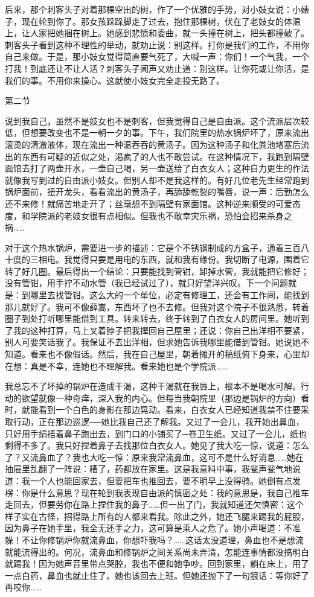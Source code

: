 后来，那个刺客头子对着那棵空出的树，作了一个优雅的手势，对小妓女说：小婊子，现在轮到你了。那女孩跺跺脚走了过去，抱住那棵树，伏在了老妓女的体温上，让人家把她捆在树上。她感到悲愤和委曲，就一头撞在树上，把头都撞破了。刺客头子看到这种不理性的举动，就劝止说：别这样。打你是我们的工作，不用你自己来做。于是，那小妓女觉得简直要气死了，大喊一声：你们！一个气我，一个打我！到底还让不让人活？刺客头子闻声又劝止道：别这样。让你死或让你活，是我们的事。不用你来操心。这就使小妓女完全走投无路了。 

第二节 

说到我自己，虽然不是妓女也不是刺客，但我觉得自己是自由派。这个流派层次较低，但想要改变也不是一朝一夕的事。下午，我们院里的热水锅炉坏了，原来流出滚烫的清澈液体，现在流出一种温吞吞的黄汤子。因为这种汤子和化粪池堵塞后流出的东西有可疑的近似之处，渴疯了的人也不敢尝试。在这种情况下，我跑到隔壁面馆去打了两壶开水，一壶自己喝，另一壶送给了白衣女人；这种自力更生的作法就像我写到过的自由派小妓女。但别人却不是我这样的。有好几位老先生经常跑到锅炉面前，扭开龙头，看看流出的黄汤子，再舔舔乾裂的嘴唇，说一声：后勤怎么还不来修！就痛苦地走开了；丝毫想不到隔壁有家面馆。这种逆来顺受的可爱态度，和学院派的老妓女很有点相似。但我也不敢幸灾乐祸，恐怕会招来杀身之祸…… 

对于这个热水锅炉，需要进一步的描述：它是个不锈钢制成的方盒子，通着三百八十度的三相电。我觉得只要是用电的东西，就和我有缘份。我切断了电源，围着它转了好几圈。最后得出一个结论：只要能找到管钳，卸掉水管，我就能把它修好；没有管钳，用手拧不动水管（我已经试过了），就只好望洋兴叹。下一个问题就是：到哪里去找管钳。这么大的一个单位，必定有修理工，还会有工作间，能找到那儿就好了。我可不像薛嵩，东西坏了也不去修。但我对这个院子不很熟悉，转着圈子到处打听哪里能借到工具。转来转去，终于转到了白衣女人的房间里。她听到了我的这种打算，马上叉着脖子把我撵回自己屋里；还说：你自己出洋相不要紧，别人可要笑话我了。我保证不去出洋相，但求她告诉我哪里能借到管钳。她说她不知道。看来也不像假话。然后，我在自己屋里，朝着摊开的稿纸俯下身来，心里却在想：真是不幸，连她也不理解我。看来她也是个学院派…… 

我总忘不了坏掉的锅炉在造成干渴，这种干渴就在我唇上，根本不是喝水可解。行动的欲望就像一种奇痒，深入我的内心。但每当我朝院里（那边是锅炉的方向）看时，就能看到一个白色的身影在那边晃动。看来，白衣女人已经知道我禁不住要采取行动，正在那边巡逻──她比我自己还了解我。又过了一会儿，我开始出鼻血，只好用手绢捂着鼻子跑出去，到门口的小铺买了─卷卫生纸。又过了一会儿，纸也剩得不多了。我只好捏着鼻子去找那位白衣女人。她见了我大吃一惊，说道：怎么了？又流鼻血了？我也大吃一惊：原来我常流鼻血，这可不是什么好消息……她在抽屉里乱翻了一阵说：糟了，药都放在家里。这是我意料中事，我瓮声瓮气地说道：我一个人也能回家去，但要把车也推回去，要不明早上没得骑。她倒有点发楞：你是什么意思？现在轮到我表现自由派的慎密之处：我的意思是，我自己推车走回去，但要劳你在路上捏住我的鼻子……但一出了门，我就知道还欠慎密：这个样子实在古怪，招得路上所有的人都来看我。除此之外，她还飞腿来踢我的屁股，因为鼻子在她手里，我全无还手之力，这可算是乘人之危了。她小声喝道：不准躲！不让你修锅炉你就流鼻血，你想吓我吗？……这话太没道理，鼻血也不是想流就能流得出的。何况，流鼻血和修锅炉之间关系尚未弄清，怎能连事情都没搞明白就踢我！因为她声音里带点哭腔，我也不便和她争吵。回到家里，躺在床上，用了一点白药，鼻血也就止住了。她也该回去上班。但她还抛下了一句狠话：等你好了再咬你…… 

